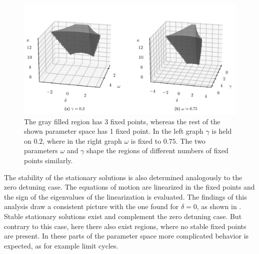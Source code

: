 \begin{figure}[H]
    \hspace*{-1.2cm}
    \includegraphics{pictures/numb_of_fixp_stab3d_gw.png}
    \caption{The gray filled region has 3 fixed points, whereas the rest of the shown parameter space has 1 fixed point. In the left graph $\gamma$ is held on $0.2$, where in the right graph $\omega$ is fixed to $0.75$. The two parameters $\omega$ and $\gamma$ shape the regions of different numbers of fixed points similarly.}%
    \label{fig:numb_of_fixp_3D}
\end{figure}
The stability of the stationary solutions is also determined analogously to the zero detuning case. The equations of motion are linearized in the fixed points and the sign of the eigenvalues of the linearization is evaluated. The findings of this analysis draw a consistent picture with the one found for $\delta=0$, as shown in . Stable stationary solutions exist and complement the zero detuning case. But contrary to this case, here there also exist regions, where no stable fixed points are present. In these parts of the parameter space more complicated behavior is expected, as for example limit cycles.
